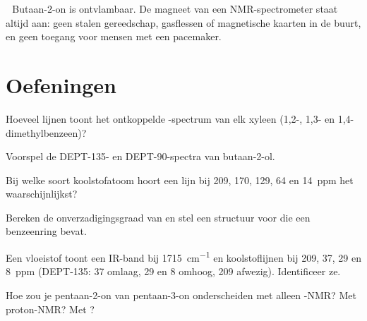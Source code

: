 \begin{safety}{\,\,}
Butaan-2-on is ontvlambaar. De magneet van een NMR-spectrometer staat altijd aan: geen stalen gereedschap,
gasflessen of magnetische kaarten in de buurt, en geen toegang voor mensen met een pacemaker.
\end{safety}

\section{Oefeningen}

\begin{exercise}[$\star$]\label{exo:b2:structure-determination:1}
Hoeveel lijnen toont het ontkoppelde -spectrum van elk xyleen (1,2-, 1,3- en
1,4-dimethylbenzeen)?
\end{exercise}

\begin{exercise}[$\star$]\label{exo:b2:structure-determination:2}
Voorspel de DEPT-135- en DEPT-90-spectra van butaan-2-ol.
\end{exercise}

\begin{exercise}[$\star$]\label{exo:b2:structure-determination:3}
Bij welke soort koolstofatoom hoort een lijn bij 209, 170, 129, 64 en 14~ppm het waarschijnlijkst?
\end{exercise}

\begin{exercise}[$\star$]\label{exo:b2:structure-determination:4}
Bereken de onverzadigingsgraad van  en stel een structuur voor die een benzeenring bevat.
\end{exercise}

\begin{exercise}[$\star\star$]\label{exo:b2:structure-determination:5}
Een vloeistof  toont een IR-band bij \qty{1715}{cm^{-1}} en koolstoflijnen bij 209, 37, 29 en 8~ppm
(DEPT-135: 37 omlaag, 29 en 8 omhoog, 209 afwezig). Identificeer ze.
\end{exercise}

\begin{exercise}[$\star\star$]\label{exo:b2:structure-determination:6}
Hoe zou je pentaan-2-on van pentaan-3-on onderscheiden met alleen -NMR? Met proton-NMR? Met
?
\end{exercise}

